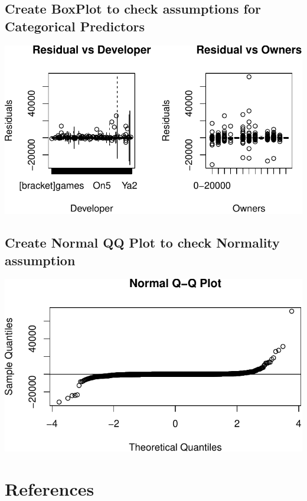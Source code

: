 \documentclass[
  letterpaper,
  DIV=11,
  numbers=noendperiod]{scrartcl}
\begin{document}
\hypertarget{create-boxplot-to-check-assumptions-for-categorical-predictors}{%
\subsection{Create BoxPlot to check assumptions for Categorical
Predictors}\label{create-boxplot-to-check-assumptions-for-categorical-predictors}}

\includegraphics{proposal_files/figure-pdf/unnamed-chunk-10-1.pdf}

\hypertarget{create-normal-qq-plot-to-check-normality-assumption}{%
\subsection{Create Normal QQ Plot to check Normality
assumption}\label{create-normal-qq-plot-to-check-normality-assumption}}

\includegraphics{proposal_files/figure-pdf/unnamed-chunk-11-1.pdf}

\newpage

\hypertarget{references}{%
\section*{References}\label{references}}
\end{document}
